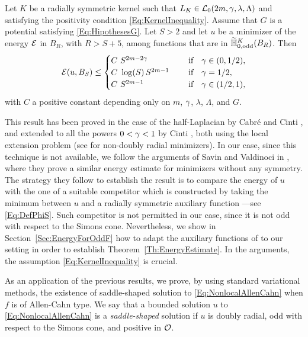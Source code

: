 \begin{theorem}
	\label{Th:EnergyEstimate} 
	Let $K$ be a radially symmetric kernel such that $L_K\in \mathcal{L}_0(2m, \gamma, \lambda, \Lambda)$ and satisfying the positivity condition \eqref{Eq:KernelInequality}. Assume that $G$ is a potential satisfying \eqref{Eq:HipothesesG}. Let $S>2$ and let $u$ be a minimizer of the energy $\mathcal{E}$ in $B_{R}$, with $R>S+5$, among functions that are in $\widetilde{\mathbb{H}}^K_{0, \mathrm{odd}}(B_R)$. Then
	$$ \mathcal{E} (u,B_S) \leq \begin{cases}
	C \ S^{2m-2\gamma}\ \ \ \ &\textrm{if } \ \ \gamma\in(0,1/2),\\
	C\ \log(S)\,S^{2m-1}\ \ \ \ &\textrm{if } \ \ \gamma=1/2,\\
	C \ S^{2m-1}\ \ \ \ &\textrm{if } \ \ \gamma\in(1/2,1),\\
	\end{cases} $$
	with $C$ a positive constant depending only on $m$, $\gamma$, $\lambda$, $\Lambda$, and $G$.
\end{theorem}

This result has been proved in the case of the half-Laplacian by Cabré and Cinti \cite{CabreCinti-EnergyHalfL}, and extended to all the powers $0<\gamma<1$ by Cinti \cite{Cinti-Saddle2}, both using the local extension problem (see \cite{CabreCinti-SharpEnergy} for non-doubly radial minimizers). In our case, since this technique is not available, we follow the arguments of Savin and Valdinoci in \cite{SavinValdinoci-EnergyEstimate}, where they prove a similar energy estimate for minimizers without any symmetry. The strategy they follow to establish the result is to compare the energy of $u$ with the one of a suitable competitor which is constructed by taking the minimum between $u$ and a radially symmetric auxiliary function ---see \eqref{Eq:DefPhiS}. Such competitor is not permitted in our case, since it is not odd with respect to the Simons cone. Nevertheless, we show in Section~\ref{Sec:EnergyForOddF} how to adapt the auxiliary functions of \cite{SavinValdinoci-EnergyEstimate} to our setting in order to establish Theorem~\ref{Th:EnergyEstimate}. In the arguments, the assumption \eqref{Eq:KernelInequality} is crucial.


As an application of the previous results, we prove, by using standard variational methods, the existence of saddle-shaped solution to \eqref{Eq:NonlocalAllenCahn} when $f$ is of Allen-Cahn type. We say that a bounded solution $u$ to \eqref{Eq:NonlocalAllenCahn} is a \emph{saddle-shaped} solution if $u$ is doubly radial, odd with respect to the Simons cone, and positive in $\mathcal{O}$. 

